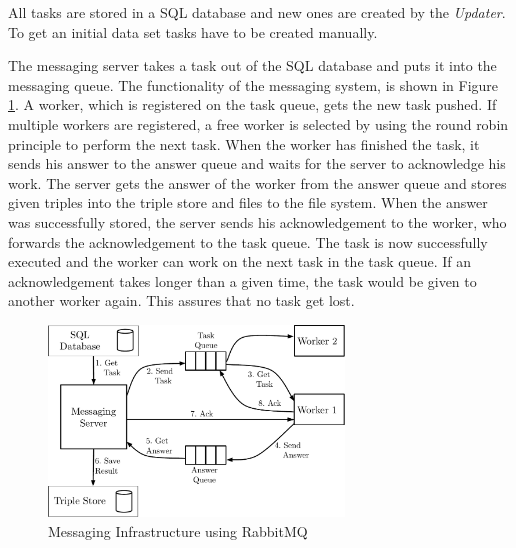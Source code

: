 All tasks are stored in a SQL database and new ones are created by the \textit{Updater}.
To get an initial data set tasks have to be created manually.

The messaging server takes a task out of the SQL database and puts it into the messaging queue.
The functionality of the messaging system, is shown in Figure \ref{fig_messaging_infrastructure}.
A worker, which is registered on the task queue, gets the new task pushed.
If multiple workers are registered, a free worker is selected by using the round robin principle to perform the next task.
When the worker has finished the task, it sends his answer to the answer queue and waits for the server to acknowledge his work.
The server gets the answer of the worker from the answer queue and stores given triples into the triple store and files to the file system.
When the answer was successfully stored, the server sends his acknowledgement to the worker, who forwards the acknowledgement to the task queue.
The task is now successfully executed and the worker can work on the next task in the task queue.
If an acknowledgement takes longer than a given time, the task would be given to another worker again.
This assures that no task get lost.

\begin{figure}[ht]
  \begin{center}
  \includegraphics[width=0.7\textwidth]{images/rabbit_mq.pdf}
  \end{center}
  \caption{Messaging Infrastructure using RabbitMQ}
  \label{fig_messaging_infrastructure}
\end{figure}